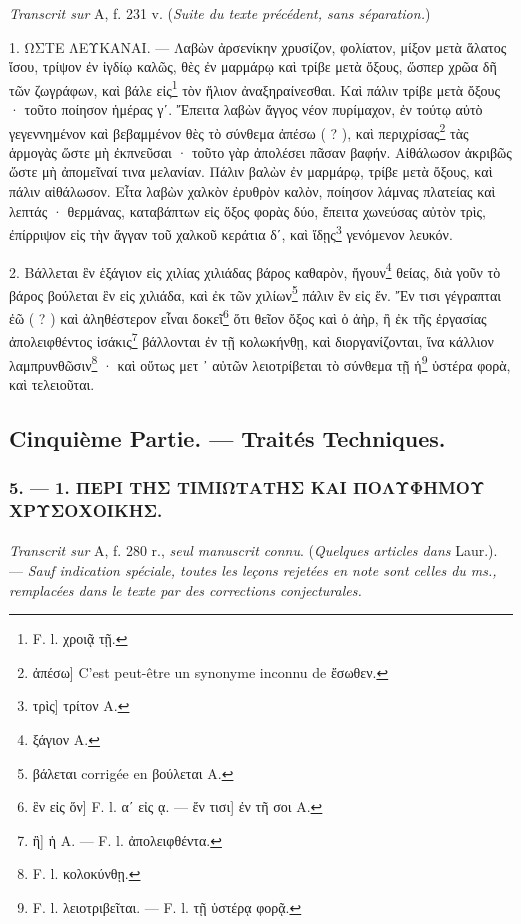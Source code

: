 \documentclass[a4paper, 11pt, oneside, polutonikogreek, french]{article}
\begin{document}
\emph{Transcrit sur} A, f. 231 v. (\emph{Suite du texte précédent, sans séparation.})

\bigskip

1. ΩΣΤΕ ΛΕΥΚΑΝΑΙ. --- Λαβὼν ἀρσενίκην χρυσίζον, φολίατον, μίξον μετὰ ἅλατος ἴσου, τρίψον ἐν ἰγδίῳ καλῶς, θὲς ἐν μαρμάρῳ καὶ τρίβε μετὰ ὄξους, ὥσπερ χρῶα δῆ τῶν ζωγράφων, καὶ βάλε εἰς\footnote{F. l. χροιᾷ τῇ.} τὸν ἥλιον ἀναξηραίνεσθαι. Καὶ πάλιν τρίβε μετὰ ὄξους · τοῦτο ποίησον ἡμέρας γʹ. Ἔπειτα λαβὼν ἄγγος νέον πυρίμαχον, ἐν τούτῳ αὐτὸ γεγεννημένον καὶ βεβαμμένον θὲς τὸ σύνθεμα ἀπέσω ( ? ), καὶ περιχρίσας\footnote{ἀπέσω] C'est peut-être un synonyme inconnu de ἔσωθεν.} τὰς ἁρμογὰς ὥστε μὴ ἐκπνεῦσαι · τοῦτο γὰρ ἀπολέσει πᾶσαν βαφήν. Αἰθάλωσον ἀκριβῶς ὥστε μὴ ἀπομεῖναί τινα μελανίαν. Πάλιν βαλὼν ἐν μαρμάρῳ, τρίβε μετὰ ὄξους, καὶ πάλιν αἰθάλωσον. Εἶτα λαβὼν χαλκὸν ἐρυθρὸν καλὸν, ποίησον λάμνας πλατείας καὶ λεπτάς · θερμάνας, καταβάπτων εἰς ὄξος φορὰς δύο, ἔπειτα χωνεύσας αὐτὸν τρὶς, ἐπίρριψον εἰς τὴν ἄγγαν τοῦ χαλκοῦ κεράτια δʹ, καὶ ἴδῃς\footnote{τρὶς] τρίτον A.} γενόμενον λευκόν.

2. Βάλλεται ἓν ἑξάγιον εἰς χιλίας χιλιάδας βάρος καθαρὸν, ἤγουν\footnote{ξάγιον A.} θείας, διὰ γοῦν τὸ βάρος βούλεται ἓν εἰς χιλιάδα, καὶ ἐκ τῶν χιλίων\footnote{βάλεται corrigée en βούλεται A.} πάλιν ἓν εἰς ἕν. Ἔν τισι γέγραπται ἐῶ ( ? ) καὶ ἀληθέστερον εἶναι δοκεῖ\footnote{ἓν εἰς ὅν] F. l. αʹ εἰς ᾳ. --- ἔν τισι] ἐν τῆ σοι A.} ὅτι θεῖον ὄξος καὶ ὁ ἀὴρ, ἢ ἐκ τῆς ἐργασίας ἀπολειφθέντος ἰσάκις\footnote{ἢ] ἡ A. --- F. l. ἀπολειφθέντα.} βάλλονται ἐν τῇ κολωκήνθῃ, καὶ διοργανίζονται, ἵνα κάλλιον λαμπρυνθῶσιν\footnote{F. l. κολοκύνθῃ.} · καὶ οὕτως μετ ᾽ αὐτῶν λειοτρίβεται τὸ σύνθεμα τῇ ἡ\footnote{F. l. λειοτριβεῖται. --- F. l. τῇ ὑστέρᾳ φορᾷ.} ὑστέρα φορὰ, καὶ τελειοῦται.

\bigskip
\centerline{\EightStarTaper}
\centerline{\EightStarTaper\EightStarTaper}
\bigskip
\clearpage
\subsection{Cinquième Partie. --- Traités Techniques.}
\subsubsection{5. --- 1. ΠΕΡΙ ΤΗΣ ΤΙΜΙΩΤΑΤΗΣ ΚΑΙ ΠΟΛΥΦΗΜΟΥ ΧΡΥΣΟΧΟΙΚΗΣ.}
\paragraph{}
\emph{Transcrit sur} A, f. 280 r., \emph{seul manuscrit connu}. (\emph{Quelques articles dans} Laur.). --- \emph{Sauf indication spéciale, toutes les leçons rejetées en note sont celles du ms., remplacées dans le texte par des corrections conjecturales.}
\end{document}
